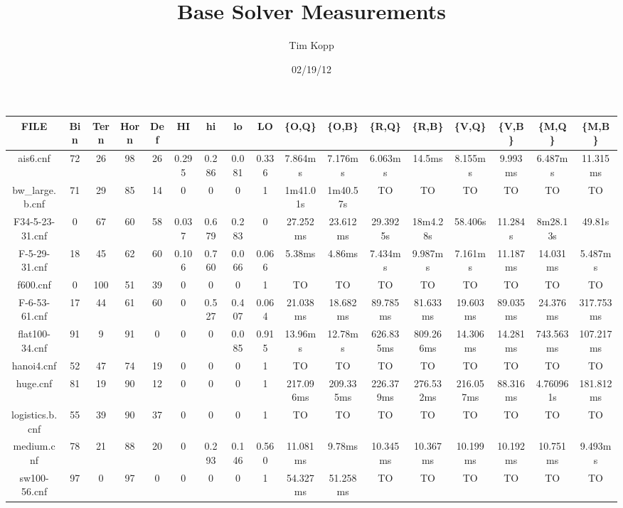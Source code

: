 \documentclass{article}
\title{Base Solver Measurements}
\author{Tim Kopp}
\date{02/19/12}
\begin{document}
\maketitle

\begin{table}[ht!]
\centering
\begin{tabular}{|c||c|c|c|c|c|c|c|c||c|c|c|c|c|c|c|c|}\hline
FILE & Bin & Tern & Horn & Def & HI & hi & lo & LO & \{O,Q\} & \{O,B\} & \{R,Q\} & \{R,B\} & \{V,Q\} & \{V,B\} & \{M,Q\} & \{M,B\} \\\hline\hline
ais6.cnf & 72 & 26 & 98 & 26 & 0.295 & 0.286 & 0.081 & 0.336 & 7.864ms & 7.176ms & 6.063ms & 14.5ms & 8.155ms & 9.993ms & 6.487ms & 11.315ms \\\hline
bw\_large.b.cnf & 71 & 29 & 85 & 14 & 0 & 0 & 0 & 1 & 1m41.01s & 1m40.57s & TO & TO & TO & TO & TO & TO \\\hline
F34-5-23-31.cnf & 0 & 67 & 60 & 58 & 0.037 & 0.679 & 0.283 & 0 & 27.252ms & 23.612ms & 29.3925s & 18m4.28s & 58.406s & 11.284s & 8m28.13s & 49.81s \\\hline
F-5-29-31.cnf & 18 & 45 & 62 & 60 & 0.106 & 0.760 & 0.066 & 0.066 & 5.38ms & 4.86ms & 7.434ms & 9.987ms & 7.161ms & 11.187ms & 14.031ms & 5.487ms \\\hline
f600.cnf & 0 & 100 & 51 & 39 & 0 & 0 & 0 & 1 & TO & TO & TO & TO & TO & TO & TO & TO \\\hline
F-6-53-61.cnf & 17 & 44 & 61 & 60 & 0 & 0.527 & 0.407 & 0.064 & 21.038ms & 18.682ms & 89.785ms & 81.633ms & 19.603ms & 89.035ms & 24.376ms & 317.753ms \\\hline
flat100-34.cnf & 91 & 9 & 91 & 0 & 0 & 0 & 0.085 & 0.915 & 13.96ms & 12.78ms & 626.835ms & 809.266ms & 14.306ms & 14.281ms & 743.563ms & 107.217ms \\\hline
hanoi4.cnf & 52 & 47 & 74 & 19 & 0 & 0 & 0 & 1 & TO & TO & TO & TO & TO & TO & TO & TO \\\hline
huge.cnf & 81 & 19 & 90 & 12 & 0 & 0 & 0 & 1 & 217.096ms & 209.335ms & 226.379ms & 276.532ms & 216.057ms & 88.316ms & 4.760961s & 181.812ms \\\hline
logistics.b.cnf & 55 & 39 & 90 & 37 & 0 & 0 & 0 & 1& TO & TO & TO & TO & TO & TO & TO & TO \\\hline
medium.cnf & 78 & 21 & 88 & 20 & 0 & 0.293 & 0.146 & 0.560 & 11.081ms & 9.78ms & 10.345ms & 10.367ms & 10.199ms & 10.192ms & 10.751ms & 9.493ms \\\hline
sw100-56.cnf & 97 & 0 & 97 & 0 & 0 & 0 & 0 & 1 & 54.327ms & 51.258ms & TO & TO & TO & TO & TO & TO \\\hline

\end{tabular}
\end{table}
\end{document}
